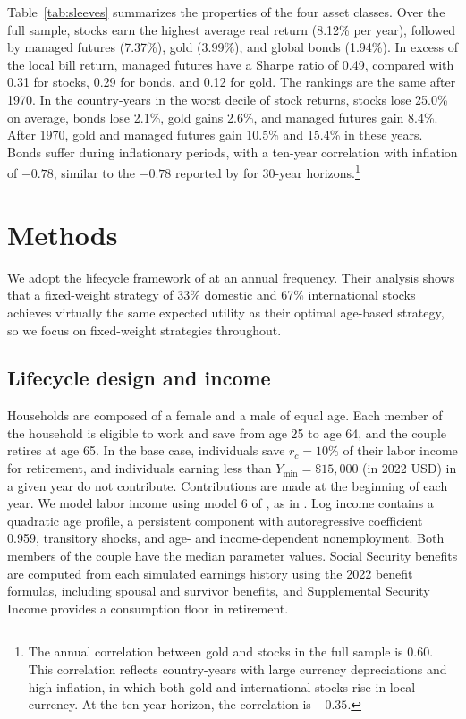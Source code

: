 \documentclass[12pt]{article}
\makeatletter
\newif\ifsubmission
\newcommand{\exhibitlist}{}
\newcommand{\exhibit}[1]{\ifsubmission\g@addto@macro\exhibitlist{}\else\fi}
\makeatother
\begin{document}
Table~\ref{tab:sleeves} summarizes the properties of the four asset classes. Over the full sample, stocks
earn the highest average real return (8.12\% per year), followed by managed futures (7.37\%), gold
(3.99\%), and global bonds (1.94\%). In excess of the local bill return, managed futures have a Sharpe
ratio of 0.49, compared with 0.31 for stocks, 0.29 for bonds, and 0.12 for gold. The rankings are the same
after 1970. In the country-years in the worst decile of stock returns, stocks lose 25.0\% on average,
bonds lose 2.1\%, gold gains 2.6\%, and managed futures gain 8.4\%. After 1970, gold and managed futures
gain 10.5\% and 15.4\% in these years. Bonds suffer during inflationary periods, with a ten-year
correlation with inflation of $-0.78$, similar to the $-0.78$ reported by
\citet{AnarkulovaCederburgODoherty2025} for 30-year horizons.\footnote{The annual correlation between gold
and stocks in the full sample is 0.60. This correlation reflects country-years with large currency
depreciations and high inflation, in which both gold and international stocks rise in local currency. At
the ten-year horizon, the correlation is $-0.35$.}
\exhibit{figures/erc/sleeves.tex}

\section{Methods}
\label{sec:methods}

We adopt the lifecycle framework of \citet{AnarkulovaCederburgODoherty2025} at an annual frequency.
Their analysis shows that a fixed-weight strategy of 33\% domestic and 67\% international stocks achieves
virtually the same expected utility as their optimal age-based strategy, so we focus on fixed-weight
strategies throughout.

\subsection{Lifecycle design and income}
\label{sec:design}\label{sec:model}\label{sec:income}\label{sec:methods-household}

Households are composed of a female and a male of equal age. Each member of the household is eligible to
work and save from age 25 to age 64, and the couple retires at age 65. In the base case, individuals save
$r_c=10\%$ of their labor income for retirement, and individuals earning less than $Y_{\min}=\$15{,}000$
(in 2022 USD) in a given year do not contribute. Contributions are made at the beginning of each year. We
model labor income using model 6 of \citet{GuvenenKarahanOzkanSong2021}, as in
\citet{AnarkulovaCederburgODoherty2025}. Log income contains a quadratic age profile, a persistent
component with autoregressive coefficient 0.959, transitory shocks, and age- and income-dependent
nonemployment. Both members of the couple have the median parameter values. Social Security benefits are
computed from each simulated earnings history using the 2022 benefit formulas, including spousal and
survivor benefits, and Supplemental Security Income provides a consumption floor in retirement.
\end{document}

